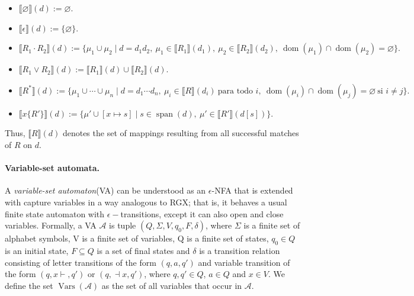 \documentclass{article}
\newcommand{\ox}{x\!\vdash}
\newcommand{\cx}{\dashv\!x}
\newcommand{\Vars}{\operatorname{Vars}}
\begin{document}
\begin{itemize}

\item $\llbracket \varnothing \rrbracket(d) := \varnothing.$

\item $\llbracket \epsilon \rrbracket(d) := \{ \varnothing \}.$

\item $\llbracket R_1 \cdot R_2 \rrbracket(d) := \{ \mu_1 \cup \mu_2 \mid d = d_1 d_2,\ \mu_1 \in \llbracket R_1 \rrbracket(d_1),\ \mu_2 \in \llbracket R_2 \rrbracket(d_2),\ \operatorname{dom}(\mu_1) \cap \operatorname{dom}(\mu_2) = \varnothing \}.$

\item $\llbracket R_1 \lor R_2 \rrbracket(d) := \llbracket R_1 \rrbracket(d) \cup \llbracket R_2 \rrbracket(d).$

\item $\llbracket R^* \rrbracket(d) := \{ \mu_1 \cup \cdots \cup \mu_n \mid d = d_1 \cdots d_n,\ \mu_i \in \llbracket R \rrbracket(d_i)\ \text{para todo } i,\ \operatorname{dom}(\mu_i) \cap \operatorname{dom}(\mu_j) = \varnothing\ \text{si } i \neq j \}.$

\item $\llbracket x\{R'\} \rrbracket(d) := \{ \mu' \cup [x \mapsto s] \mid s \in \operatorname{span}(d),\ \mu' \in \llbracket R' \rrbracket(d[s]) \}.$

\end{itemize}



Thus, $\llbracket R \rrbracket(d)$ denotes the set of mappings resulting from all successful matches of $R$ on $d$.

\paragraph{Variable-set automata.} A \textit{variable-set automaton}(VA) can be understood as an $\epsilon$-NFA that is extended with capture variables in a way analogous to RGX; that is, it behaves a usual finite state automaton with $\epsilon-$transitions, except it can also open and close variables. Formally, a VA $\mathcal{A}$ is tuple $(Q, \Sigma, V, q_0, F, \delta )$, where $\Sigma$ is a finite set of alphabet symbols, V is a finite set of variables, Q is a finite set of states, $q_0 \in Q$ is an initial state, $F \subseteq Q$ is a set of final states and $\delta$ is a transition relation consisting of letter transitions of the form $(q, a, q')$ and variable transition of the form $(q, \ox, q')$ or $(q, \cx, q')$, where $q, q' \in Q$, $a \in Q$ and $x \in V$. We define the set $\Vars(\mathcal{A})$ as the set of all variables that occur in $\mathcal{A}$.
\end{document}
